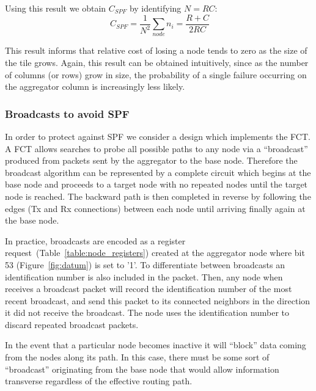 Using this result we obtain $C_{SPF}$ by identifying $N = RC$:
\begin{equation}~\label{eq:cspf_left_fin}
  C_{SPF} = \frac{1}{N^{2}}\sum_{node}n_{i} = \boxed{\frac{R+C}{2RC}}
\end{equation}

This result informs that relative cost of losing a node tends to zero as the size of the tile grows.
Again, this result can be obtained intuitively, since as the number of columns (or rows) grow in size, the probability of a single failure occurring on the aggregator column is increasingly less likely.

\subsubsection{Broadcasts to avoid SPF}\label{sec:broadcast}
In order to protect against SPF we consider a design which implements the FCT.
A FCT allows searches to probe all possible paths to any node via a ``broadcast'' produced from packets sent by the aggregator to the base node.
Therefore the broadcast algorithm can be represented by a complete circuit which begins at the base node and proceeds to a target node with no repeated nodes until the target node is reached.
The backward path is then completed in reverse by following the edges (Tx and Rx connections) between each node until arriving finally again at the base node.

In practice, broadcasts are encoded as a register request~(Table~\ref{table:node_registers}) created at the aggregator node where bit 53 (Figure~\ref{fig:datum}) is set to '1'. 
To differentiate between broadcasts an identification number is also included in the packet.
Then, any node when receives a broadcast packet will record the identification number of the most recent broadcast, and send this packet to its connected neighbors in the direction it did not receive the broadcast.
The node uses the identification number to discard repeated broadcast packets.

In the event that a particular node becomes inactive it will ``block'' data coming from the nodes along its path.
In this case, there must be some sort of ``broadcast'' originating from the base node that would allow information transverse regardless of the effective routing path.


